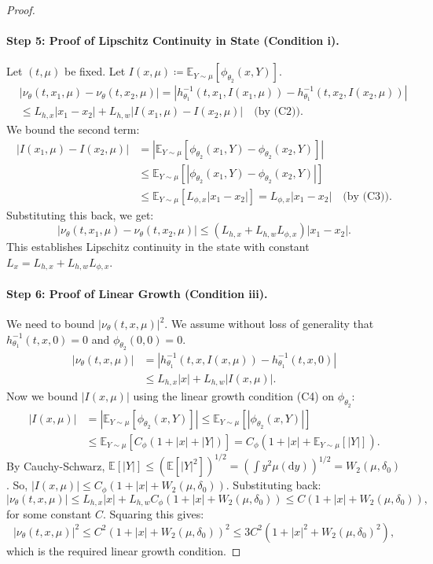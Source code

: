 \documentclass[10pt,a4paper]{amsart}
\newcommand{\E}{\mathbb{E}}
\newcommand{\dd}{\mathrm{d}}
\begin{document}
\begin{proof}
\paragraph{Step 5: Proof of Lipschitz Continuity in State (Condition i).}
Let $(t,\mu)$ be fixed. Let $I(x,\mu) \coloneqq \mathbb{E}_{Y \sim \mu}[\phi_{\theta_2}(x, Y)]$.
\begin{align*}
    &|\nu_\theta(t, x_1, \mu) - \nu_\theta(t, x_2, \mu)| = |h_{\theta_1}^{-1}(t,x_1,I(x_1,\mu)) - h_{\theta_1}^{-1}(t,x_2,I(x_2,\mu))| \\
    &\le L_{h,x}|x_1-x_2| + L_{h,w}|I(x_1,\mu) - I(x_2,\mu)| \quad \text{(by (C2))}.
\end{align*}
We bound the second term:
\begin{align*}
    |I(x_1,\mu) - I(x_2,\mu)| &= |\E_{Y \sim \mu}[\phi_{\theta_2}(x_1, Y) - \phi_{\theta_2}(x_2, Y)]| \\
    &\le \E_{Y \sim \mu}[|\phi_{\theta_2}(x_1, Y) - \phi_{\theta_2}(x_2, Y)|] \\
    &\le \E_{Y \sim \mu}[L_{\phi,x}|x_1 - x_2|] = L_{\phi,x}|x_1 - x_2| \quad \text{(by (C3))}.
\end{align*}
Substituting this back, we get:
\[ |\nu_\theta(t, x_1, \mu) - \nu_\theta(t, x_2, \mu)| \le (L_{h,x} + L_{h,w}L_{\phi,x})|x_1-x_2|. \]
This establishes Lipschitz continuity in the state with constant $L_x = L_{h,x} + L_{h,w}L_{\phi,x}$.

\paragraph{Step 6: Proof of Linear Growth (Condition iii).}
We need to bound $|\nu_\theta(t,x,\mu)|^2$. We assume without loss of generality that $h_{\theta_1}^{-1}(t,x,0)=0$ and $\phi_{\theta_2}(0,0)=0$.
\begin{align*}
    |\nu_\theta(t,x,\mu)| &= |h_{\theta_1}^{-1}(t,x,I(x,\mu)) - h_{\theta_1}^{-1}(t,x,0)| \\
    &\le L_{h,x}|x| + L_{h,w}|I(x,\mu)|.
\end{align*}
Now we bound $|I(x,\mu)|$ using the linear growth condition (C4) on $\phi_{\theta_2}$:
\begin{align*}
|I(x,\mu)| &= |\E_{Y \sim \mu}[\phi_{\theta_2}(x,Y)]| \le \E_{Y \sim \mu}[|\phi_{\theta_2}(x,Y)|] \\
&\le \E_{Y \sim \mu}[C_\phi(1+|x|+|Y|)] = C_\phi(1+|x|+\E_{Y \sim \mu}[|Y|]).
\end{align*}
By Cauchy-Schwarz, $\E[|Y|] \le (\E[|Y|^2])^{1/2} = (\int y^2 \mu(\dd y))^{1/2} = W_2(\mu,\delta_0)$.
So, $|I(x,\mu)| \le C_\phi(1+|x|+W_2(\mu,\delta_0))$. Substituting back:
\[ |\nu_\theta(t,x,\mu)| \le L_{h,x}|x| + L_{h,w}C_\phi(1+|x|+W_2(\mu,\delta_0)) \le C(1+|x|+W_2(\mu,\delta_0)), \]
for some constant $C$. Squaring this gives:
\[ |\nu_\theta(t,x,\mu)|^2 \le C^2(1+|x|+W_2(\mu,\delta_0))^2 \le 3C^2(1+|x|^2+W_2(\mu,\delta_0)^2), \]
which is the required linear growth condition.


\end{proof}
\end{document}
